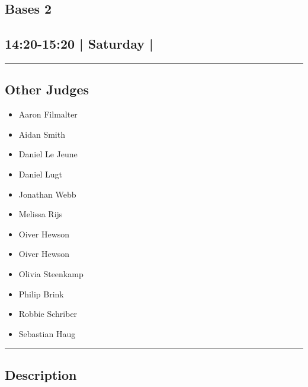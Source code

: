 \documentclass[10pt, A5]{article}
\begin{document}
		\begin{framed}
			\begin{minipage}{\textwidth}

			\setcounter{section}{45}
							\section{Bases 2}
						
			\subsection*{14:20-15:20 | Saturday | }

			\vspace{0.25cm}
			\hrule
			\vspace{0.25cm}


			\subsection*{Other Judges}
							

				\begin{multicols}{2}

			\begin{itemize}
											\item Aaron Filmalter
											\item Aidan Smith
											\item Daniel Le Jeune
											\item Daniel Lugt
											\item Jonathan Webb
											\item Melissa Rijs
											\item Oiver Hewson
								\end{itemize}

			\vfill\null
			\columnbreak

			\begin{itemize}
											\item Oiver Hewson
											\item Olivia Steenkamp
											\item Philip Brink
											\item Robbie Schriber
											\item Sebastian Haug
								\end{itemize}

			\vfill\null

			\end{multicols}

			\vspace{0.25cm}
			\hrule
			\vspace{0.25cm}

			\begin{minipage}{\textwidth}
			\subsection*{\faListAlt \: Description}
			
			\end{minipage}


	\end{minipage}
	\end{framed}
\end{document}
